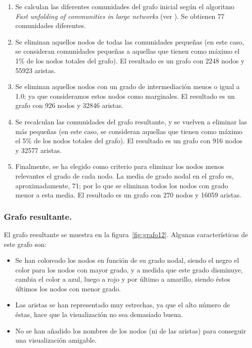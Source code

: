 \begin{enumerate}
	\item Se calculan las diferentes comunidades del grafo inicial según el algoritmo \emph{Fast unfolding of communities in large networks}  (ver \cite{blondel}). Se obtienen 77 comunidades diferentes.
	\item Se eliminan aquellos nodos de todas las comunidades pequeñas (en este caso, se consideran comunidades pequeñas a aquellas que tienen como máximo el 1\% de los nodos totales del grafo). El resultado es un grafo con 2248 nodos y 55923 aristas.
 	\item Se eliminan aquellos nodos con un grado de intermediación menos o igual a 1.0; ya que consideramos estos nodos como marginales. El resultado es un grafo con 926 nodos y 32846 aristas.
	\item Se recalculan las comunidades del grafo resultante, y se vuelven a eliminar las más pequeñas (en este caso, se consideran aquellas que tienen como máximo el 5\% de los nodos totales del grafo). El resultado es un grafo con 916 nodos y 32577 aristas.
	\item Finalmente, se ha elegido como criterio para eliminar los nodos menos relevantes el grado de cada nodo. La media de grado nodal en el grafo es, aproximadamente, 71; por lo que se eliminan todos los nodos con grado menor a esta media. El resultado es un grafo con 270 nodos y 16059 aristas.
\end{enumerate}


\subsubsection{Grafo resultante.}

El grafo resultante se muestra en la figura~\ref{fig:grafo12}. Algunas características de este grafo son:
\begin{itemize}
\item    Se han coloreado los nodos en función de su grado nodal, siendo el negro el color para los nodos con mayor grado, y a medida que este grado disminuye, cambia el color a azul, luego a rojo y por último a amarillo, siendo éstos últimos los nodos con menor grado.
\item    Las aristas se han representado muy estrechas, ya que el alto número de éstas, hace que la visualización no sea demasiado buena.
\item    No se han añadido los nombres de los nodos (ni de las aristas) para conseguir una visualización amigable.
\end{itemize}

